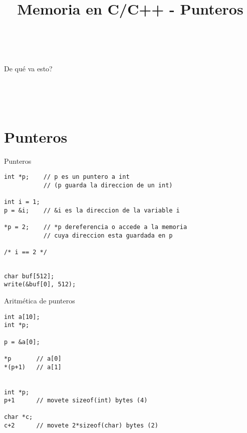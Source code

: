 

\title%
{Memoria en C/C++ - Punteros}


\subject{Memoria en C/C++ - Punteros}




\begin{frame}
   \titlepage
\end{frame}

~%
\begin{frame}{De qu\'e va esto?}
   \tableofcontents
\end{frame}
~%

~%
\section{Punteros}
\begin{frame}[fragile]{Punteros}
         \begin{lstlisting}[style=normal]
int *p;    // p es un puntero a int
           // (p guarda la direccion de un int)

int i = 1;
p = &i;    // &i es la direccion de la variable i

*p = 2;    // *p dereferencia o accede a la memoria
           // cuya direccion esta guardada en p

/* i == 2 */

         \end{lstlisting}
         \begin{lstlisting}[style=normal]

char buf[512];
write(&buf[0], 512);

         \end{lstlisting}
\end{frame}

\begin{frame}[fragile]{Aritm\'etica de punteros}
         \begin{lstlisting}[style=normal]
int a[10];
int *p;

p = &a[0];

*p       // a[0]
*(p+1)   // a[1]


int *p;
p+1      // movete sizeof(int) bytes (4)

char *c;
c+2      // movete 2*sizeof(char) bytes (2)

         \end{lstlisting}
\end{frame}


